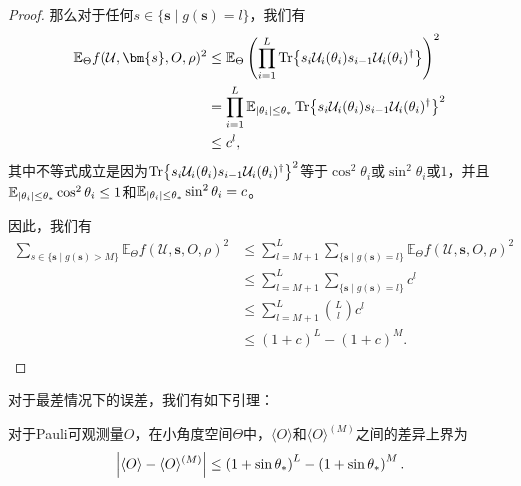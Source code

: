 \begin{proof}
    那么对于任何$s\in\{\bm{s}\mid g(\bm{s})= l\}$，我们有
    \begin{equation}
        \begin{aligned}
        \mathbb{E}_{\Theta}f(\mathcal{U},\bm{s},O,\rho)^2 &\leq \mathbb{E}_{\Theta}\left(\prod_{i=1}^{L}\Tr{s_i\mathcal{U}_i(\theta_i) s_{i-1}\mathcal{U}_i(\theta_i)^\dagger}\right)^2\\
        &= \prod_{i=1}^{L}\mathbb{E}_{\abs{\theta_i}\leq \theta_*}\Tr{s_i\mathcal{U}_i(\theta_i) s_{i-1}\mathcal{U}_i(\theta_i)^\dagger}^2\\
        & \leq c^{l},
        \end{aligned}
    \end{equation}
    其中不等式成立是因为$\Tr{s_i\mathcal{U}_i(\theta_i) s_{i-1}\mathcal{U}_i(\theta_i)^\dagger}^2$等于$\cos^2{\theta_i}$或$\sin^2{\theta_i}$或$1$，并且$\mathbb{E}_{\abs{\theta_i}\leq \theta_*}\cos^2{\theta_i}\leq 1$和$\mathbb{E}_{\abs{\theta_i}\leq \theta_*}\sin^2{\theta_i}=c$。

    因此，我们有
    \begin{equation}
    \begin{aligned}
        \sum_{s\in\{\bm{s}\mid g(\bm{s})>M\}} \mathbb{E}_{\Theta}f(\mathcal{U},\bm{s},O,\rho)^2 &\leq \sum_{l=M+1}^{L} \sum_{\{\bm{s}\mid g(\bm{s})=l\}} \mathbb{E}_{\Theta}f(\mathcal{U},\bm{s},O,\rho)^2\\
        & \leq \sum_{l=M+1}^{L} \sum_{\{\bm{s}\mid g(\bm{s})=l\}} c^l \\
        & \leq \sum_{l=M+1}^{L} \binom{L}{l} c^l\\
        & \leq  \left(1+c\right)^L-\left(1+c\right)^M.\\
      \end{aligned}
\end{equation}

\end{proof}

对于最差情况下的误差，我们有如下引理：
\begin{lemma}
    对于Pauli可观测量$O$，在小角度空间$\Theta$中，$\langle O \rangle$和$\langle O \rangle ^{(M)}$之间的差异上界为
    \begin{equation}
        \abs{\langle O \rangle - \langle O \rangle ^{(M)}} \leq  \left(1+\sin{\theta_*}\right)^L - \left(1+\sin{\theta_*}\right)^M.
    \end{equation}
\end{lemma}

